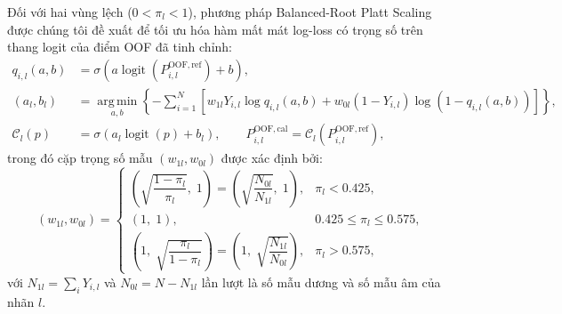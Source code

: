 \documentclass[11pt,a4paper]{article}
\begin{document}
Đối với hai vùng lệch (\(0 < \pi_l < 1\)), phương pháp Balanced-Root Platt Scaling được chúng tôi đề xuất để tối ưu hóa hàm mất mát log-loss có trọng số trên thang logit của điểm OOF đã tinh chỉnh:
\begin{align}
q_{i,l}(a, b) &= \sigma\left(a \operatorname{logit}\left(P^{\mathrm{OOF,ref}}_{i,l}\right) + b\right), \label{eq:platt-model} \\
(a_l, b_l) &= \operatorname*{arg\,min}_{a, b} \left\{ -\sum_{i=1}^{N} \left[ w_{1l} Y_{i,l} \log q_{i,l}(a, b) + w_{0l}(1-Y_{i,l}) \log(1-q_{i,l}(a, b)) \right] \right\}, \label{eq:platt-loss} \\
\mathcal C_l(p) &= \sigma\left(a_l \operatorname{logit}(p) + b_l\right), \qquad P^{\mathrm{OOF,cal}}_{i,l} = \mathcal C_l\left(P^{\mathrm{OOF,ref}}_{i,l}\right), \label{eq:platt-apply}
\end{align}
trong đó cặp trọng số mẫu \((w_{1l}, w_{0l})\) được xác định bởi:
\begin{equation}
(w_{1l}, w_{0l}) =
\begin{cases}
\left(\sqrt{\dfrac{1-\pi_l}{\pi_l}}, \; 1\right) = \left(\sqrt{\dfrac{N_{0l}}{N_{1l}}}, \; 1\right), & \pi_l < 0.425, \\
(1, \; 1), & 0.425 \le \pi_l \le 0.575, \\
\left(1, \; \sqrt{\dfrac{\pi_l}{1-\pi_l}}\right) = \left(1, \; \sqrt{\dfrac{N_{1l}}{N_{0l}}}\right), & \pi_l > 0.575,
\end{cases}
\label{eq:class-weights}
\end{equation}
với \(N_{1l} = \sum_i Y_{i,l}\) và \(N_{0l} = N - N_{1l}\) lần lượt là số mẫu dương và số mẫu âm của nhãn \(l\).
\end{document}
